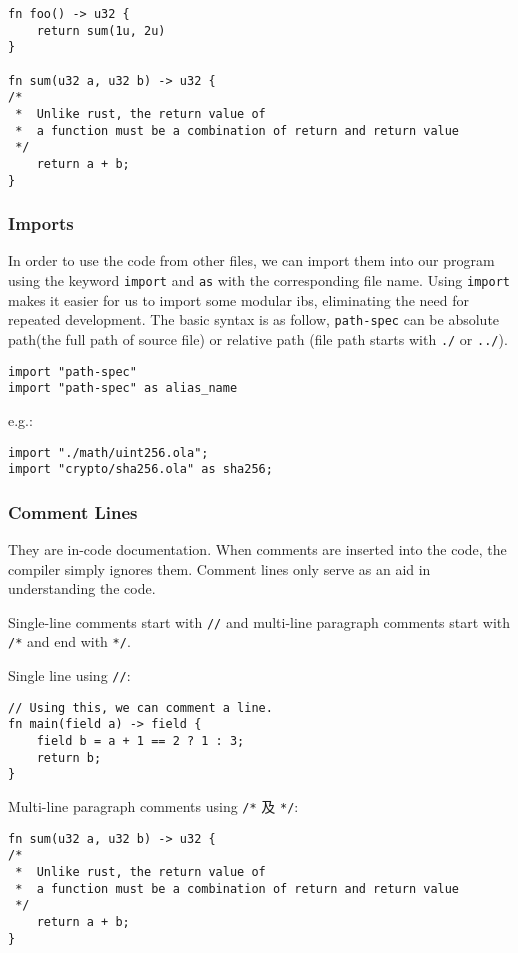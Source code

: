 \begin{lstlisting}
fn foo() -> u32 {
    return sum(1u, 2u)
}

fn sum(u32 a, u32 b) -> u32 {
/* 
 *  Unlike rust, the return value of 
 *  a function must be a combination of return and return value
 */
    return a + b;
}
\end{lstlisting}

\subsubsection{Imports}

In order to use the code from other files, we can import them into our program using the keyword \verb|import| and \verb|as| with the corresponding file name.
Using \verb|import| makes it easier for us to import some modular ibs, eliminating the need for repeated development.
The basic syntax is as follow, \verb|path-spec| can be absolute path(the full path of source file) or relative path (file path starts with \verb|./| or \verb|../|).

\begin{lstlisting}
import "path-spec"
import "path-spec" as alias_name
\end{lstlisting}

e.g.:

\begin{lstlisting}
import "./math/uint256.ola";
import "crypto/sha256.ola" as sha256;
\end{lstlisting}

\subsubsection{Comment Lines}

They are in-code documentation. When comments are inserted into the code, the compiler simply ignores them. Comment lines only serve as an aid in understanding the code.

Single-line comments start with \texttt{//} and multi-line paragraph comments start with \texttt{/*} and end with \texttt{*/}.

Single line using \texttt{//}:
\begin{lstlisting}
// Using this, we can comment a line.
fn main(field a) -> field {
    field b = a + 1 == 2 ? 1 : 3;
    return b;
}
\end{lstlisting}

Multi-line paragraph comments using \texttt{/*} 及 \texttt{*/}:
\begin{lstlisting}
fn sum(u32 a, u32 b) -> u32 {
/* 
 *  Unlike rust, the return value of 
 *  a function must be a combination of return and return value
 */
    return a + b;
}
\end{lstlisting}




